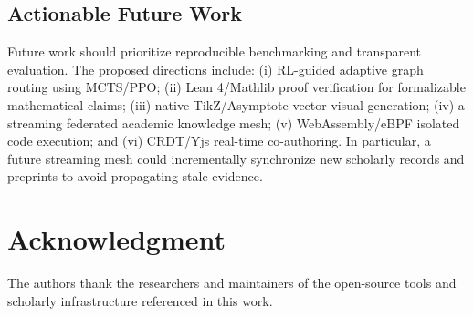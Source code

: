 \documentclass[conference]{IEEEtran}
\begin{document}
\subsection{Actionable Future Work}
Future work should prioritize reproducible benchmarking and transparent evaluation. The proposed directions include: (i) RL-guided adaptive graph routing using MCTS/PPO; (ii) Lean 4/Mathlib proof verification for formalizable mathematical claims; (iii) native TikZ/Asymptote vector visual generation; (iv) a streaming federated academic knowledge mesh; (v) WebAssembly/eBPF isolated code execution; and (vi) CRDT/Yjs real-time co-authoring. In particular, a future streaming mesh could incrementally synchronize new scholarly records and preprints to avoid propagating stale evidence.

\section*{Acknowledgment}
The authors thank the researchers and maintainers of the open-source tools and scholarly infrastructure referenced in this work.
\end{document}
